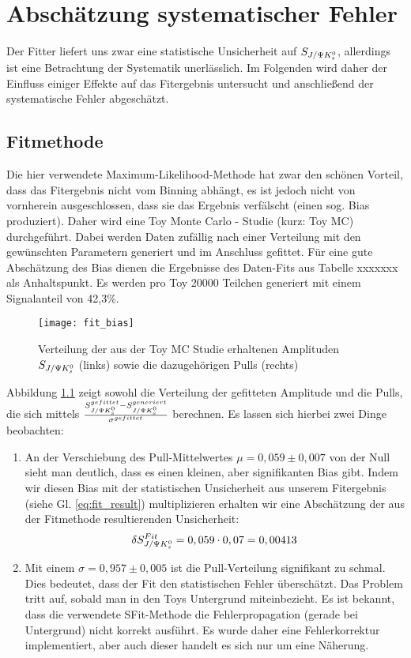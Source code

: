 \chapter{Abschätzung systematischer Fehler}
Der Fitter liefert uns zwar eine statistische Unsicherheit auf $S_{J/\Psi K_s^0}$, allerdings ist eine Betrachtung der Systematik unerlässlich. Im Folgenden wird daher der Einfluss einiger Effekte auf das Fitergebnis untersucht und anschließend der systematische Fehler abgeschätzt.

\section{Fitmethode} \label{kap:fit_bias}
Die hier verwendete Maximum-Likelihood-Methode hat zwar den schönen Vorteil, dass das Fitergebnis nicht vom Binning abhängt, es ist jedoch nicht von vornherein ausgeschlossen, dass sie das Ergebnis verfälscht (einen sog. Bias produziert). Daher wird eine Toy Monte Carlo - Studie (kurz: Toy MC) durchgeführt. Dabei werden Daten zufällig nach einer Verteilung mit den gewünschten Parametern generiert und im Anschluss gefittet. Für eine gute Abschätzung des Bias dienen die Ergebnisse des Daten-Fits aus Tabelle xxxxxxx als Anhaltspunkt. Es werden pro Toy 20000 Teilchen generiert mit einem Signalanteil von 42,3\%.

\begin{figure}[hptb]
\centering
\texttt{[image: fit\_bias]}
\caption{Verteilung der aus der Toy MC Studie erhaltenen Amplituden $S_{J/\Psi K_s^0}$ (links) sowie die dazugehörigen Pulls (rechts)}
\label{fig:fit_bias}
\end{figure}

Abbildung \ref{fig:fit_bias} zeigt sowohl die Verteilung der gefitteten Amplitude und die Pulls, die sich mittels $\frac{S_{J/\Psi K_s^0}^{gefittet} - S_{J/\Psi K_s^0}^{generiert}}{\sigma^{gefittet}}$ berechnen. Es lassen sich hierbei zwei Dinge beobachten:
\begin{enumerate}
    \item An der Verschiebung des Pull-Mittelwertes $\mu = 0,059 \pm 0,007$ von der Null sieht man deutlich, dass es einen kleinen, aber signifikanten Bias gibt. Indem wir diesen Bias mit der statistischen Unsicherheit aus unserem Fitergebnis (siehe Gl. \ref{eq:fit_result}) multiplizieren erhalten wir eine Abschätzung der aus der Fitmethode resultierenden Unsicherheit:
        \begin{align}
        \delta S_{J/\Psi K_s^0}^{Fit} = 0,059 \cdot 0,07 = 0,00413
        \end{align}

    \item Mit einem $\sigma = 0,957 \pm 0,005$ ist die Pull-Verteilung signifikant zu schmal. Dies bedeutet, dass der Fit den statistischen Fehler überschätzt. Das Problem tritt auf, sobald man in den Toys Untergrund miteinbezieht. Es ist bekannt, dass die verwendete SFit-Methode die Fehlerpropagation (gerade bei Untergrund) nicht korrekt ausführt. Es wurde daher eine Fehlerkorrektur implementiert, aber auch dieser handelt es sich nur um eine Näherung.
\end{enumerate}

